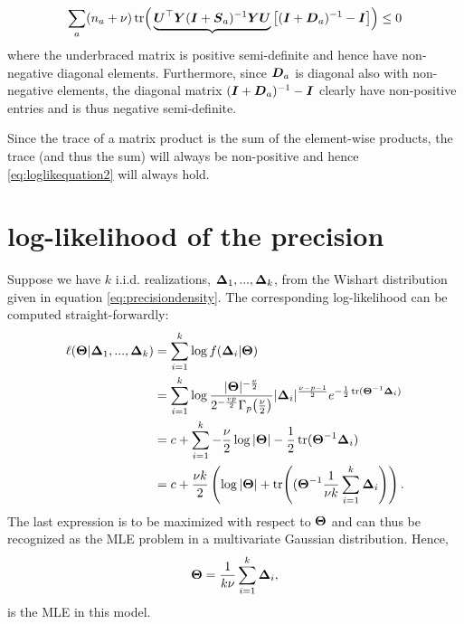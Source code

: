\documentclass{article}\usepackage[]{graphicx}\usepackage[]{color}
\begin{document}
\begin{align}
  \sum_a (n_a + \nu)\operatorname*{tr}\!\Big(
    \underbrace{{\boldsymbol{U}}^\top {\boldsymbol{Y}} ({\boldsymbol{I}} + {\boldsymbol{S}}_a)^{-1} {\boldsymbol{Y}} {\boldsymbol{U}}}
    \big[ ({\boldsymbol{I}} + {\boldsymbol{D}}_a)^{-1}  - {\boldsymbol{I}} \big]
  \Big)
  \leq 0
  \label{eq:loglikequation2}
\end{align}
where the underbraced matrix is positive semi-definite and hence have non-negative diagonal elements.
Furthermore, since ${\boldsymbol{D}}_a$ is diagonal also with non-negative elements, the diagonal matrix $({\boldsymbol{I}} + {\boldsymbol{D}}_a)^{-1}  - {\boldsymbol{I}}$ clearly have non-positive entries and is thus negative semi-definite.

Since the trace of a matrix product is the sum of the element-wise products, the trace (and thus the sum) will always be non-positive and hence \eqref{eq:loglikequation2} will always hold.

\section{log-likelihood of the precision}
\label{sec:precisionloglik}
Suppose we have $k$ i.i.d. realizations, ${\boldsymbol{\Delta}}_1, ..., {\boldsymbol{\Delta}}_k$, from the Wishart distribution given in equation \eqref{eq:precisiondensity}. The corresponding log-likelihood can be computed straight-forwardly:
\begin{align*}
  \ell({\boldsymbol{\Theta}} | {\boldsymbol{\Delta}}_1, ..., {\boldsymbol{\Delta}}_k)
  &= \sum_{i = 1}^k \log f({\boldsymbol{\Delta}}_i | {\boldsymbol{\Theta}}) \\
  &= \sum_{i = 1}^k \log
    \frac{|{\boldsymbol{\Theta}}|^{-\frac{\nu}{2}}}{
      2^{-\frac{vp}{2}}
      \Gamma_p\!\left(\frac{\nu}{2}\right)}
    |{\boldsymbol{\Delta}}_i|^\frac{\nu - p - 1}{2}e^{-\frac{1}{2}\operatorname*{tr}({\boldsymbol{\Theta}}^{-1}{\boldsymbol{\Delta}}_i)}\\
   &= c + \sum_{i = 1}^k
     -\frac{\nu}{2} \log |{\boldsymbol{\Theta}}|
     -\frac{1}{2}\operatorname*{tr}({\boldsymbol{\Theta}}^{-1}{\boldsymbol{\Delta}}_i) \\
   &= c + \frac{\nu k}{2}
     \left(
       \log |{\boldsymbol{\Theta}}| +
       \operatorname*{tr}\!\left(({\boldsymbol{\Theta}}^{-1} \frac{1}{\nu k}\sum_{i = 1}^k{\boldsymbol{\Delta}}_i\right)
     \right).
\end{align*}
The last expression is to be maximized with respect to ${\boldsymbol{\Theta}}$ and can thus be recognized as the MLE problem in a multivariate Gaussian distribution. Hence,
\begin{align*}
  {\boldsymbol{\Theta}} = \frac{1}{k \nu} \sum_{i = 1}^k {\boldsymbol{\Delta}}_i,
\end{align*}
is the MLE in this model.
\end{document}
